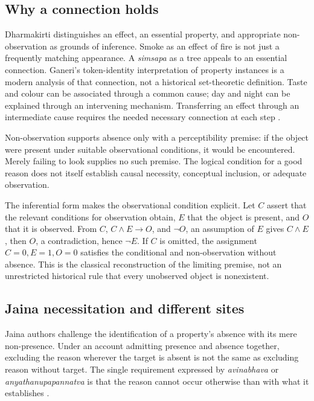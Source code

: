 \subsection{Why a connection holds}

Dharmakirti distinguishes an effect, an essential property, and appropriate
non-observation as grounds of inference. Smoke as an effect of fire is not
just a frequently matching appearance. A \emph{simsapa} as a tree appeals
to an essential connection. Ganeri's token-identity interpretation of
property instances is a modern analysis of that connection, not a historical
set-theoretic definition. Taste and colour can be associated through a
common cause; day and night can be explained through an intervening
mechanism. Transferring an effect through an intermediate cause requires
the needed necessary connection at each step
\cite[pp.~350--352]{Ganeri2004IndianLogicPublished}.

Non-observation supports absence only with a perceptibility premise:
if the object were present under suitable observational conditions,
it would be encountered. Merely failing to look supplies no such premise.
The logical condition for a good reason does not itself establish
causal necessity, conceptual inclusion, or adequate observation.

The inferential form makes the observational condition explicit.
Let \(C\) assert that the relevant conditions for observation obtain,
\(E\) that the object is present, and \(O\) that it is observed.
From \(C\), \(C\land E\to O\), and \(\neg O\), an assumption of \(E\)
gives \(C\land E\), then \(O\), a contradiction, hence \(\neg E\).
If \(C\) is omitted, the assignment \(C=0,E=1,O=0\) satisfies
the conditional and non-observation without absence. This is the
classical reconstruction of the limiting premise, not an unrestricted
historical rule that every unobserved object is nonexistent.

\subsection{Jaina necessitation and different sites}

Jaina authors challenge the identification of a property's absence with
its mere non-presence. Under an account admitting presence and absence
together, excluding the reason wherever the target is absent is not the
same as excluding reason without target. The single requirement expressed
by \emph{avinabhava} or \emph{anyathanupapannatva} is that the reason cannot
occur otherwise than with what it establishes
\cite[pp.~352--354]{Ganeri2004IndianLogicPublished}.

